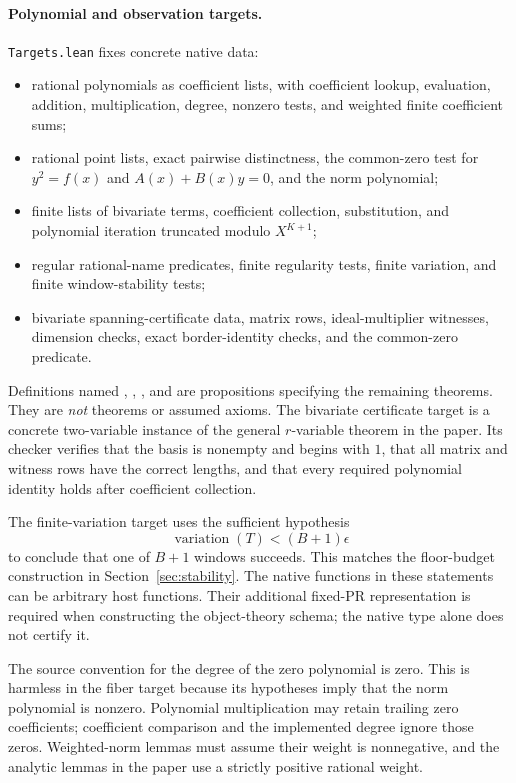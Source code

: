 \paragraph{Polynomial and observation targets.}
\texttt{Targets.lean} fixes concrete native data:
\begin{itemize}
\item rational polynomials as coefficient lists, with coefficient lookup,
evaluation, addition, multiplication, degree, nonzero tests, and weighted
finite coefficient sums;
\item rational point lists, exact pairwise distinctness, the common-zero
test for $y^2=f(x)$ and $A(x)+B(x)y=0$, and the norm polynomial;
\item finite lists of bivariate terms, coefficient collection, substitution,
and polynomial iteration truncated modulo $X^{K+1}$;
\item regular rational-name predicates, finite regularity tests, finite
variation, and finite window-stability tests;
\item bivariate spanning-certificate data, matrix rows, ideal-multiplier
witnesses, dimension checks, exact border-identity checks, and the
common-zero predicate.
\end{itemize}
Definitions named ,
,
, and 
are propositions specifying the remaining theorems. They are \emph{not}
theorems or assumed axioms. The bivariate certificate target is a concrete
two-variable instance of the general $r$-variable theorem in the paper.
Its checker verifies that the basis is nonempty and begins with $1$,
that all matrix and witness rows have the correct lengths, and that
every required polynomial identity holds after coefficient collection.

The finite-variation target uses the sufficient hypothesis
\[
 \operatorname{variation}(T)<(B+1)\epsilon
\]
to conclude that one of $B+1$ windows succeeds. This matches the
floor-budget construction in Section~\ref{sec:stability}. The native
functions in these statements can be arbitrary host functions. Their
additional fixed-PR representation is required when constructing the
object-theory schema; the native type alone does not certify it.

The source convention for the degree of the zero polynomial is zero.
This is harmless in the fiber target because its hypotheses imply
that the norm polynomial is nonzero. Polynomial multiplication may
retain trailing zero coefficients; coefficient comparison and the
implemented degree ignore those zeros. Weighted-norm lemmas must assume
their weight is nonnegative, and the analytic lemmas in the paper use
a strictly positive rational weight.

